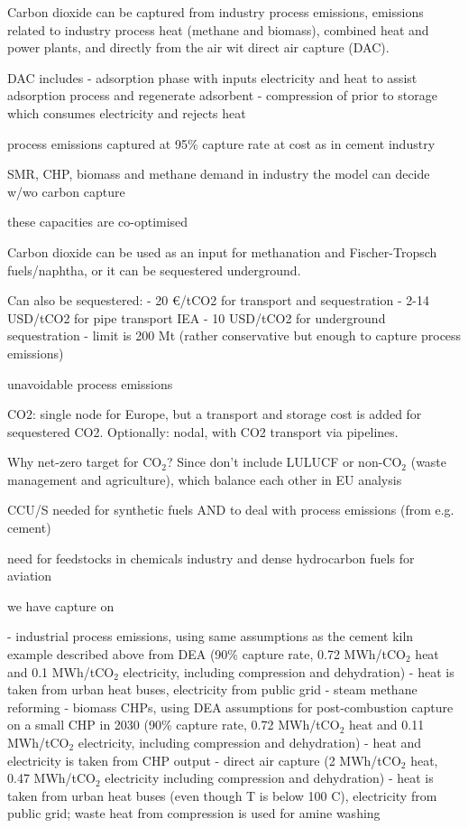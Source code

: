 Carbon dioxide can be captured from industry process emissions, emissions
related to industry process heat (methane and biomass), combined heat and power plants, and directly
from the air wit direct air capture (DAC).

DAC includes
- adsorption phase with inputs electricity and heat to assist adsorption process and regenerate adsorbent
- compression of \co{} prior to storage which consumes electricity and rejects heat

process emissions captured at 95\% capture rate at cost as in cement industry

SMR, CHP, biomass and methane demand in industry the model can decide w/wo carbon capture

these capacities are co-optimised

Carbon dioxide can be used as an input for methanation and Fischer-Tropsch
fuels/naphtha, or it can be sequestered underground.

Can also be sequestered:
- 20 \euro/tCO2 for transport and sequestration
- 2-14 USD/tCO2 for pipe transport IEA
- 10 USD/tCO2 for underground sequestration
- limit is 200 Mt (rather conservative but enough to capture process emissions)

unavoidable process emissions

CO2: single node for Europe, but a transport and storage cost is added for sequestered CO2. Optionally: nodal, with CO2 transport via pipelines.

Why net-zero target for CO$_2$? Since don't include LULUCF or non-CO$_2$ (waste management and agriculture), which balance each other in EU analysis

CCU/S needed for synthetic fuels AND to deal with process emissions (from e.g.
cement)



need for feedstocks in chemicals industry and dense hydrocarbon fuels for aviation

we have capture on

- industrial process emissions, using same assumptions as the cement kiln
example described above from DEA  (90\% capture rate, 0.72 MWh/tCO$_2$ heat and
0.1 MWh/tCO$_2$ electricity, including compression and dehydration) - heat is
taken from urban heat buses, electricity from public grid - steam methane
reforming - biomass CHPs, using DEA assumptions for post-combustion capture on a
small CHP in 2030 (90\% capture rate, 0.72 MWh/tCO$_2$ heat and 0.11 MWh/tCO$_2$
electricity, including compression and dehydration) - heat and electricity is
taken from CHP output - direct air capture (2 MWh/tCO$_2$ heat, 0.47 MWh/tCO$_2$
electricity including compression and dehydration) - heat is taken from urban
heat buses (even though T is below 100 C), electricity from public grid; waste
heat from compression is used for amine washing


